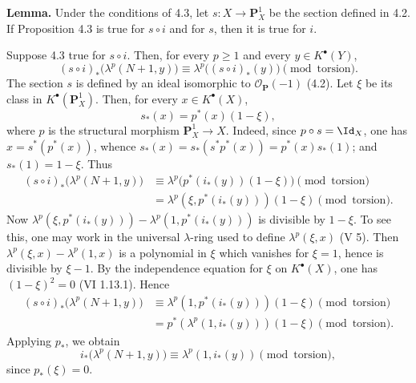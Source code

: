 \textbf{Lemma.} Under the conditions of 4.3, let \(s:X\to\mathbf P_X^1\) be the section defined in 4.2. If Proposition 4.3 is true for \(s\circ i\) and for \(s\), then it is true for \(i\).

Suppose 4.3 true for \(s\circ i\). Then, for every \(p\ge1\) and every \(y\in K^\bullet(Y)\),
\begin{equation}\tag{4.3.3}
 (s\circ i)_*\bigl(\lambda^p(N+1,y)\bigr)
 \equiv
 \lambda^p\bigl((s\circ i)_*(y)\bigr)
 \pmod{\text{torsion}}.
\end{equation}
The section \(s\) is defined by an ideal isomorphic to \(\mathcal O_{\mathbf P}(-1)\) (4.2). Let \(\xi\) be its class in \(K^\bullet(\mathbf P_X^1)\). Then, for every \(x\in K^\bullet(X)\),
\[
  s_*(x)=p^*(x)(1-\xi),
\]
where \(p\) is the structural morphism \(\mathbf P_X^1\to X\). Indeed, since \(p\circ s=\Id_X\), one has \(x=s^*(p^*(x))\), whence \(s_*(x)=s_*(s^*p^*(x))=p^*(x)s_*(1)\); and \(s_*(1)=1-\xi\). Thus
\[
\begin{aligned}
(s\circ i)_*\bigl(\lambda^p(N+1,y)\bigr)
&\equiv \lambda^p\bigl(p^*(i_*(y))(1-\xi)\bigr)\pmod{\text{torsion}}\\
&= \lambda^p(\xi,p^*(i_*(y)))(1-\xi)\pmod{\text{torsion}}.
\end{aligned}
\]
Now \(\lambda^p(\xi,p^*(i_*(y)))-\lambda^p(1,p^*(i_*(y)))\) is divisible by \(1-\xi\). To see this, one may work in the universal \(\lambda\)-ring used to define \(\lambda^p(\xi,x)\) (V 5). Then \(\lambda^p(\xi,x)-\lambda^p(1,x)\) is a polynomial in \(\xi\) which vanishes for \(\xi=1\), hence is divisible by \(\xi-1\). By the independence equation for \(\xi\) on \(K^\bullet(X)\), one has \((1-\xi)^2=0\) (VI 1.13.1). Hence
\[
\begin{aligned}
(s\circ i)_*\bigl(\lambda^p(N+1,y)\bigr)
&\equiv \lambda^p(1,p^*(i_*(y)))(1-\xi) \pmod{\text{torsion}}\\
&=p^*(\lambda^p(1,i_*(y)))(1-\xi) \pmod{\text{torsion}}.
\end{aligned}
\]
Applying \(p_*\), we obtain
\begin{equation}\tag{4.3.4}
  i_*\bigl(\lambda^p(N+1,y)\bigr)
  \equiv \lambda^p(1,i_*(y)) \pmod{\text{torsion}},
\end{equation}
since \(p_*(\xi)=0\).


